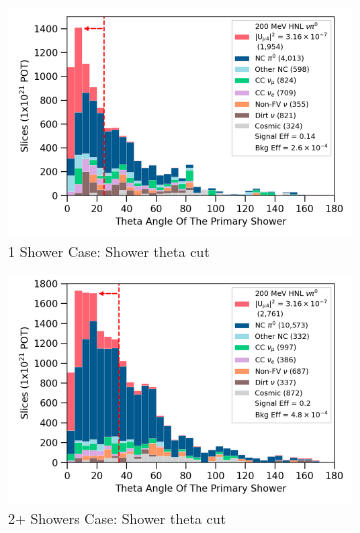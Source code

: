 \begin{figure}[b!]
        \begin{subfigure}[b]{0.495\textwidth}   
            \centering 
            \includegraphics[width=\textwidth]{one_shower_theta_precut}
            \caption{1 Shower Case: Shower theta cut}%
	    \label{fig:1shw_theta_cut}
        \end{subfigure}
        \hfill
        \begin{subfigure}[b]{0.495\textwidth}   
            \centering 
            \includegraphics[width=\textwidth]{two_shower_primary_theta_precut}
            \caption{2+ Showers Case: Shower theta cut}%
	    \label{fig:2shw_theta_cut}
        \end{subfigure}
        \hfill
	\centering
        \begin{subfigure}[b]{0.495\textwidth}   
            \centering 

\end{subfigure}
\end{figure}
